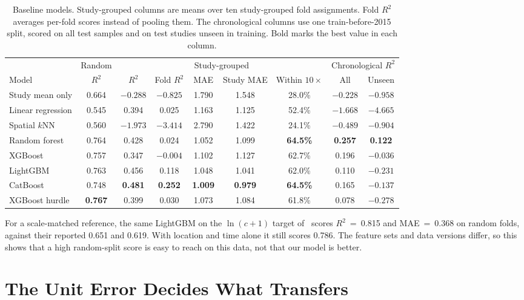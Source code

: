 \documentclass[12pt,a4paper]{report}
\newcommand{\Rsq}{$R^2$}
\begin{document}
\begin{table}[!htbp]
\centering
\caption[Baseline models under random, study-grouped, and chronological validation]{Baseline models. Study-grouped columns are means over ten study-grouped fold assignments. Fold \Rsq{} averages per-fold scores instead of pooling them. The chronological columns use one train-before-2015 split, scored on all test samples and on test studies unseen in training. Bold marks the best value in each column.}
\label{tab:baseline}
\small
\setlength{\tabcolsep}{3pt}
\begin{tabular}{@{}lcccccccc@{}}
\toprule
 & Random & \multicolumn{5}{c}{Study-grouped} & \multicolumn{2}{c}{Chronological \Rsq}\\
\cmidrule(lr){3-7}\cmidrule(lr){8-9}
Model & \Rsq & \Rsq & Fold \Rsq & MAE & Study MAE & Within $10\times$ & All & Unseen\\
\midrule
Study mean only & 0.664 & $-0.288$ & $-0.825$ & 1.790 & 1.548 & 28.0\% & $-0.228$ & $-0.958$\\
Linear regression & 0.545 & 0.394 & 0.025 & 1.163 & 1.125 & 52.4\% & $-1.668$ & $-4.665$\\
Spatial $k$NN & 0.560 & $-1.973$ & $-3.414$ & 2.790 & 1.422 & 24.1\% & $-0.489$ & $-0.904$\\
Random forest & 0.764 & 0.428 & 0.024 & 1.052 & 1.099 & \textbf{64.5\%} & \textbf{0.257} & \textbf{0.122}\\
XGBoost & 0.757 & 0.347 & $-0.004$ & 1.102 & 1.127 & 62.7\% & 0.196 & $-0.036$\\
LightGBM & 0.763 & 0.456 & 0.118 & 1.048 & 1.041 & 62.0\% & 0.110 & $-0.231$\\
CatBoost & 0.748 & \textbf{0.481} & \textbf{0.252} & \textbf{1.009} & \textbf{0.979} & \textbf{64.5\%} & 0.165 & $-0.137$\\
XGBoost hurdle & \textbf{0.767} & 0.399 & 0.030 & 1.073 & 1.084 & 61.8\% & 0.078 & $-0.278$\\
\bottomrule
\end{tabular}
\end{table}

For a scale-matched reference, the same LightGBM on the $\ln(c+1)$ target of~\cite{dalvi2026} scores \Rsq{}~=~0.815 and MAE~=~0.368 on random folds, against their reported 0.651 and 0.619. With location and time alone it still scores 0.786. The feature sets and data versions differ, so this shows that a high random-split score is easy to reach on this data, not that our model is better.

\section{The Unit Error Decides What Transfers}
\end{document}
